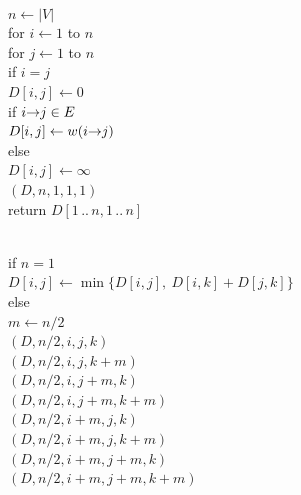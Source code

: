 \begin{exercises}
\begin{center}
\begin{minipage}[c]{0.44\linewidth}
\begin{pseudocode}
\\
$n \gets |V|$\\
for $i \gets 1$ to $n$\\
\Indent for $j \gets 1$ to $n$\\
\Indent\Indent if $i = j$\\
\Indent\Indent\Indent $D[i, j] \gets 0$\\
\Indent\Indent if $i\mathord{\rightarrow}j \in E$\\
\Indent\Indent\Indent $D[i, j] \gets w(i\mathord{\rightarrow}j)$\\
\Indent\Indent else\\
\Indent\Indent\Indent $D[i, j] \gets \infty$\\
$(D, n, 1, 1, 1)$\\
return $D[1\,..\,n, 1\,..\,n]$
\end{pseudocode}
\end{minipage}\hfill
\begin{minipage}[c]{0.54\linewidth}
\begin{pseudocode}
\\
if $n = 1$\\
\Indent $D[i, j] \gets \min\bigl\{D[i, j],\ D[i, k] + D[j, k]\bigr\}$\\
else\\
\Indent $m \gets n/2$\\
\Indent {}$(D, n/2, i, j, k)$\\
\Indent {}$(D, n/2, i, j, k+m)$\\
\Indent {}$(D, n/2, i, j+m, k)$\\
\Indent {}$(D, n/2, i, j+m, k+m)$\\
\Indent {}$(D, n/2, i+m, j, k)$\\
\Indent {}$(D, n/2, i+m, j, k+m)$\\
\Indent {}$(D, n/2, i+m, j+m, k)$\\
\Indent {}$(D, n/2, i+m, j+m, k+m)$
\end{pseudocode}
\end{minipage}
\end{center}


\end{exercises}
